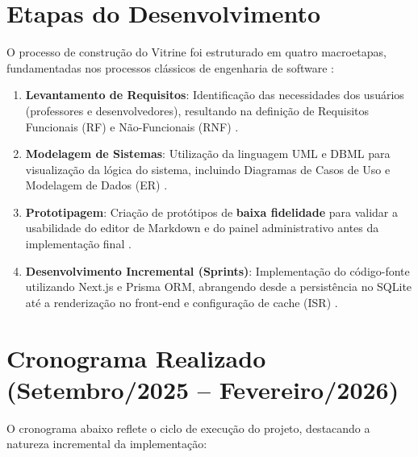 \section{Etapas do Desenvolvimento}

O processo de construção do Vitrine foi estruturado em quatro macroetapas, fundamentadas nos processos clássicos de engenharia de software \cite{Sommerville2011}:

\begin{enumerate}
    \item \textbf{Levantamento de Requisitos}: Identificação das necessidades dos usuários (professores e desenvolvedores), resultando na definição de Requisitos Funcionais (RF) e Não-Funcionais (RNF) \cite{Sommerville2011}.
    \item \textbf{Modelagem de Sistemas}: Utilização da linguagem UML e DBML para visualização da lógica do sistema, incluindo Diagramas de Casos de Uso e Modelagem de Dados (ER) \cite{Sommerville2011}.
    \item \textbf{Prototipagem}: Criação de protótipos de \textbf{baixa fidelidade} para validar a usabilidade do editor de Markdown e do painel administrativo antes da implementação final \cite{Sommerville2011}.
    \item \textbf{Desenvolvimento Incremental (Sprints)}: Implementação do código-fonte utilizando Next.js e Prisma ORM, abrangendo desde a persistência no SQLite até a renderização no front-end e configuração de cache (ISR) \cite{nextjs_docs, prisma_docs}.
\end{enumerate}

\section{Cronograma Realizado (Setembro/2025 -- Fevereiro/2026)}

O cronograma abaixo reflete o ciclo de execução do projeto, destacando a natureza incremental da implementação:

